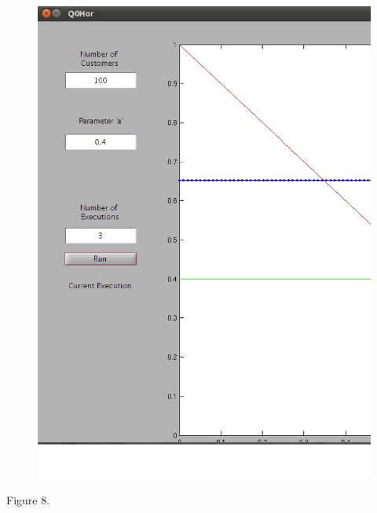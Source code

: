 \begin{itemize}
\begin{center}
\begin{figure}[h!]
\includegraphics[scale=0.2]{q1dec.eps} 
\end{figure}
Figure 8.
\end{center}

\newpage


\end{itemize}
